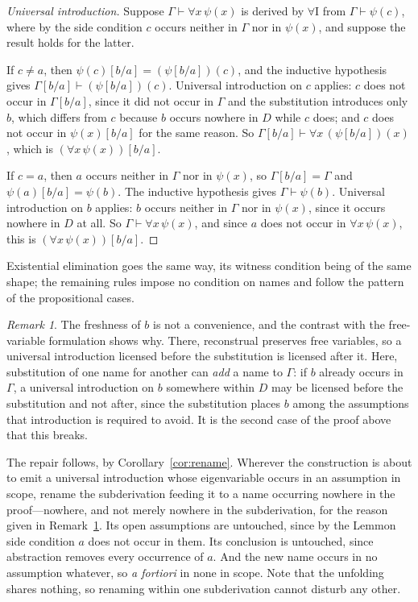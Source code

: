 \documentclass[11pt]{article}
\theoremstyle{plain}
\theoremstyle{definition}
\theoremstyle{remark}
\newtheorem{remark}[theorem]{Remark}
\begin{document}
\begin{proof}[Universal introduction]
Suppose $\Gamma \vdash \forall x\,\psi(x)$ is derived by $\forall$I from
$\Gamma \vdash \psi(c)$, where by the side condition $c$ occurs neither in
$\Gamma$ nor in $\psi(x)$, and suppose the result holds for the latter.

If $c \neq a$, then $\psi(c)[b/a] = (\psi[b/a])(c)$, and the inductive
hypothesis gives $\Gamma[b/a] \vdash (\psi[b/a])(c)$. Universal introduction
on $c$ applies: $c$ does not occur in $\Gamma[b/a]$, since it did not occur in
$\Gamma$ and the substitution introduces only $b$, which differs from $c$
because $b$ occurs nowhere in $D$ while $c$ does; and $c$ does not occur in
$\psi(x)[b/a]$ for the same reason. So
$\Gamma[b/a] \vdash \forall x\,(\psi[b/a])(x)$, which is
$(\forall x\,\psi(x))[b/a]$.

If $c = a$, then $a$ occurs neither in $\Gamma$ nor in $\psi(x)$, so
$\Gamma[b/a] = \Gamma$ and $\psi(a)[b/a] = \psi(b)$. The inductive hypothesis
gives $\Gamma \vdash \psi(b)$. Universal introduction on $b$ applies: $b$
occurs neither in $\Gamma$ nor in $\psi(x)$, since it occurs nowhere in $D$ at
all. So $\Gamma \vdash \forall x\,\psi(x)$, and since $a$ does not occur in
$\forall x\,\psi(x)$, this is $(\forall x\,\psi(x))[b/a]$.
\end{proof}

Existential elimination goes the same way, its witness condition being of the
same shape; the remaining rules impose no condition on names and follow the
pattern of the propositional cases.

\begin{remark}\label{rem:freshness}
The freshness of $b$ is not a convenience, and the contrast with the
free-variable formulation shows why. There, reconstrual preserves free
variables, so a universal introduction licensed before the substitution is
licensed after it. Here, substitution of one name for another can \emph{add} a
name to $\Gamma$: if $b$ already occurs in $\Gamma$, a universal introduction
on $b$ somewhere within $D$ may be licensed before the substitution and not
after, since the substitution places $b$ among the assumptions that
introduction is required to avoid. It is the second case of the proof above
that this breaks.
\end{remark}

The repair follows, by Corollary~\ref{cor:rename}. Wherever the construction
is about to emit a universal introduction whose eigenvariable occurs in an
assumption in scope, rename the subderivation feeding it to a name occurring
nowhere in the proof---nowhere, and not merely nowhere in the subderivation,
for the reason given in Remark~\ref{rem:freshness}. Its open assumptions are
untouched, since by the Lemmon side condition $a$ does not occur in them. Its conclusion is untouched, since abstraction removes every
occurrence of $a$. And the new name occurs in no assumption whatever, so
\emph{a fortiori} in none in scope. Note that the unfolding shares nothing, so
renaming within one subderivation cannot disturb any other.
\end{document}
